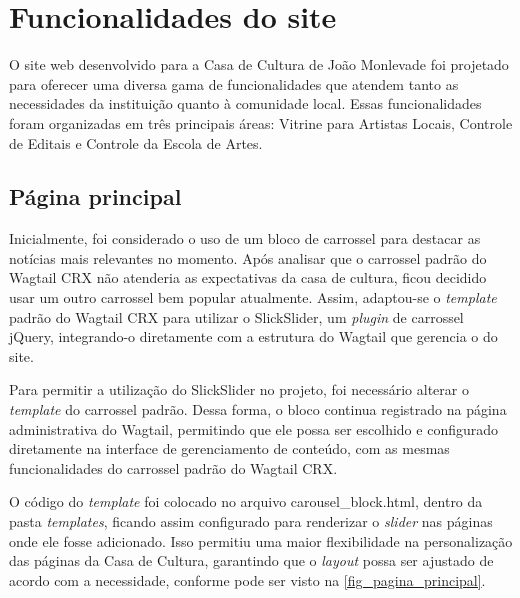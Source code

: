 \section{Funcionalidades do site}

O site web desenvolvido para a Casa de Cultura de João Monlevade foi projetado para oferecer uma diversa gama de funcionalidades que atendem tanto as necessidades da instituição quanto à comunidade local. Essas funcionalidades foram organizadas em três principais áreas: Vitrine para Artistas Locais, Controle de Editais e Controle da Escola de Artes.

\subsection{Página principal}

Inicialmente, foi considerado o uso de um bloco de carrossel para destacar as notícias mais relevantes no momento. Após analisar que o carrossel padrão do Wagtail CRX não atenderia as expectativas da casa de cultura, ficou decidido usar um outro carrossel bem popular atualmente. Assim, adaptou-se o \textit{template} padrão do Wagtail CRX para utilizar o SlickSlider, um \textit{plugin} de carrossel jQuery, integrando-o diretamente com a estrutura do Wagtail que gerencia o  do site.

Para permitir a utilização do SlickSlider no projeto, foi necessário alterar o \textit{template} do carrossel padrão. Dessa forma, o bloco continua registrado na página administrativa do Wagtail, permitindo que ele possa ser escolhido e configurado diretamente na interface de gerenciamento de conteúdo, com as mesmas funcionalidades do carrossel padrão do Wagtail CRX.

O código do \textit{template} foi colocado no arquivo carousel\_block.html, dentro da pasta \textit{templates}, ficando assim configurado para renderizar o \textit{slider} nas páginas onde ele fosse adicionado. Isso permitiu uma maior flexibilidade na personalização das páginas da Casa de Cultura, garantindo que o \textit{layout} possa ser ajustado de acordo com a necessidade, conforme pode ser visto na \autoref{fig_pagina_principal}.

